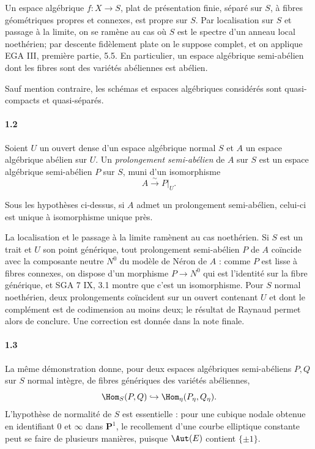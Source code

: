 Un espace algébrique $f:X\to S$, plat de présentation finie, séparé sur $S$, à fibres géométriques propres et connexes, est propre sur $S$. Par localisation sur $S$ et passage à la limite, on se ramène au cas où $S$ est le spectre d'un anneau local noethérien; par descente fidèlement plate on le suppose complet, et on applique EGA III, première partie, 5.5. En particulier, un espace algébrique semi-abélien dont les fibres sont des variétés abéliennes est abélien.

Sauf mention contraire, les schémas et espaces algébriques considérés sont quasi-compacts et quasi-séparés.

\paragraph{1.2}
Soient $U$ un ouvert dense d'un espace algébrique normal $S$ et $A$ un espace algébrique abélien sur $U$. Un \emph{prolongement semi-abélien} de $A$ sur $S$ est un espace algébrique semi-abélien $P$ sur $S$, muni d'un isomorphisme
\[
  A\xrightarrow{\sim}P|_U .
\]

\begin{theorem}[Raynaud]
Sous les hypothèses ci-dessus, si $A$ admet un prolongement semi-abélien, celui-ci est unique à isomorphisme unique près.
\end{theorem}

La localisation et le passage à la limite ramènent au cas noethérien. Si $S$ est un trait et $U$ son point générique, tout prolongement semi-abélien $P$ de $A$ coïncide avec la composante neutre $N^0$ du modèle de Néron de $A$ : comme $P$ est lisse à fibres connexes, on dispose d'un morphisme $P\to N^0$ qui est l'identité sur la fibre générique, et SGA 7 IX, 3.1 montre que c'est un isomorphisme. Pour $S$ normal noethérien, deux prolongements coïncident sur un ouvert contenant $U$ et dont le complément est de codimension au moins deux; le résultat de Raynaud permet alors de conclure. Une correction est donnée dans la note finale.

\paragraph{1.3}
La même démonstration donne, pour deux espaces algébriques semi-abéliens $P,Q$ sur $S$ normal intègre, de fibres génériques des variétés abéliennes,
\[
  \Hom_S(P,Q)\hookrightarrow \Hom_\eta(P_\eta,Q_\eta).
\]
L'hypothèse de normalité de $S$ est essentielle : pour une cubique nodale obtenue en identifiant $0$ et $\infty$ dans $\mathbf P^1$, le recollement d'une courbe elliptique constante peut se faire de plusieurs manières, puisque $\Aut(E)$ contient $\{\pm1\}$.


